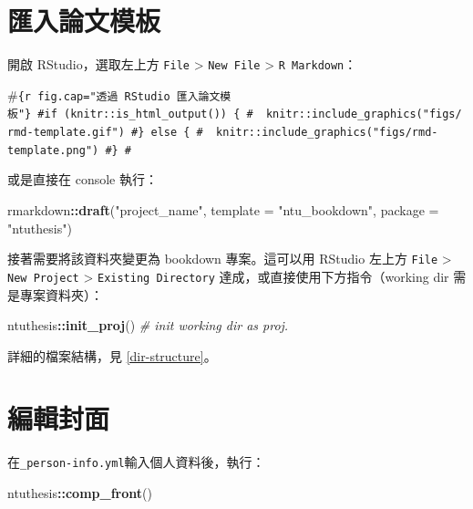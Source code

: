 \documentclass[oneside]{book}
\newenvironment{Shaded}{\begin{snugshade}}{\end{snugshade}}
\newcommand{\CommentTok}[1]{\textcolor[rgb]{0.56,0.35,0.01}{\textit{#1}}}
\newcommand{\DataTypeTok}[1]{\textcolor[rgb]{0.13,0.29,0.53}{#1}}
\newcommand{\KeywordTok}[1]{\textcolor[rgb]{0.13,0.29,0.53}{\textbf{#1}}}
\newcommand{\NormalTok}[1]{#1}
\newcommand{\OperatorTok}[1]{\textcolor[rgb]{0.81,0.36,0.00}{\textbf{#1}}}
\newcommand{\StringTok}[1]{\textcolor[rgb]{0.31,0.60,0.02}{#1}}
\begin{document}
\hypertarget{import-template}{%
\section{匯入論文模板}\label{import-template}}

開啟 RStudio，選取左上方 \texttt{File} \textgreater{} \texttt{New\ File} \textgreater{} \texttt{R\ Markdown}：

\#\texttt{\{r\ fig.cap="透過\ RStudio\ 匯入論文模板"\}\ \#if\ (knitr::is\_html\_output())\ \{\ \#\ \ knitr::include\_graphics("figs/rmd-template.gif")\ \#\}\ else\ \{\ \#\ \ knitr::include\_graphics("figs/rmd-template.png")\ \#\}\ \#}

或是直接在 console 執行：

\begin{Shaded}
\begin{Highlighting}[]
\NormalTok{rmarkdown}\OperatorTok{::}\KeywordTok{draft}\NormalTok{(}\StringTok{"project_name"}\NormalTok{,}
                 \DataTypeTok{template =} \StringTok{"ntu_bookdown"}\NormalTok{,}
                 \DataTypeTok{package =} \StringTok{"ntuthesis"}\NormalTok{)}
\end{Highlighting}
\end{Shaded}

接著需要將該資料夾變更為 bookdown 專案。這可以用 RStudio 左上方 \texttt{File} \textgreater{} \texttt{New\ Project} \textgreater{} \texttt{Existing\ Directory} 達成，或直接使用下方指令（working dir 需是專案資料夾）：

\begin{Shaded}
\begin{Highlighting}[]
\NormalTok{ntuthesis}\OperatorTok{::}\KeywordTok{init_proj}\NormalTok{()  }\CommentTok{# init working dir as proj.}
\end{Highlighting}
\end{Shaded}

詳細的檔案結構，見 \ref{dir-structure}。

\hypertarget{edit-front-matter}{%
\section{編輯封面}\label{edit-front-matter}}

在\texttt{\_person-info.yml}輸入個人資料後，執行：

\begin{Shaded}
\begin{Highlighting}[]
\NormalTok{ntuthesis}\OperatorTok{::}\KeywordTok{comp_front}\NormalTok{()}
\end{Highlighting}
\end{Shaded}
\end{document}
